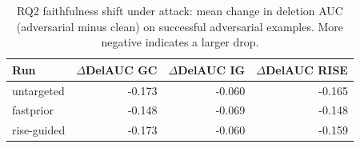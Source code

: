 \begin{table}[t]
\centering
\small
\setlength{\tabcolsep}{4pt}
\renewcommand{\arraystretch}{1.15}
\caption{RQ2 faithfulness shift under attack: mean change in deletion AUC (adversarial minus clean) on successful adversarial examples. More negative indicates a larger drop.}
\label{tab:rq2_del_delta}
\begin{tabular}{lrrr}
\toprule
Run & $\Delta$DelAUC GC & $\Delta$DelAUC IG & $\Delta$DelAUC RISE \\
\midrule
untargeted & -0.173 & -0.060 & -0.165 \\
fastprior & -0.148 & -0.069 & -0.148 \\
rise-guided & -0.173 & -0.060 & -0.159 \\
\bottomrule
\end{tabular}
\end{table}
